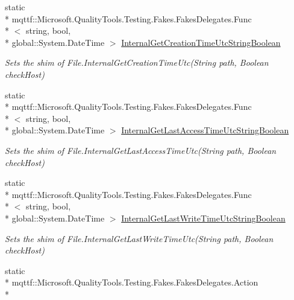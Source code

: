 \begin{DoxyCompactItemize}
static \\*
mqttf\-::\-Microsoft.\-Quality\-Tools.\-Testing.\-Fakes.\-Fakes\-Delegates.\-Func\\*
$<$ string, bool, \\*
global\-::\-System.\-Date\-Time $>$ \hyperlink{class_system_1_1_i_o_1_1_fakes_1_1_shim_file_ae49c156032823cdee2ac4b15a4be9dab}{Internal\-Get\-Creation\-Time\-Utc\-String\-Boolean}
\begin{DoxyCompactList}\small\item\em Sets the shim of File.\-Internal\-Get\-Creation\-Time\-Utc(\-String path, Boolean check\-Host)\end{DoxyCompactList}\item 
static \\*
mqttf\-::\-Microsoft.\-Quality\-Tools.\-Testing.\-Fakes.\-Fakes\-Delegates.\-Func\\*
$<$ string, bool, \\*
global\-::\-System.\-Date\-Time $>$ \hyperlink{class_system_1_1_i_o_1_1_fakes_1_1_shim_file_a506f1d51c9c4233bc8cae18f378a7c01}{Internal\-Get\-Last\-Access\-Time\-Utc\-String\-Boolean}
\begin{DoxyCompactList}\small\item\em Sets the shim of File.\-Internal\-Get\-Last\-Access\-Time\-Utc(\-String path, Boolean check\-Host)\end{DoxyCompactList}\item 
static \\*
mqttf\-::\-Microsoft.\-Quality\-Tools.\-Testing.\-Fakes.\-Fakes\-Delegates.\-Func\\*
$<$ string, bool, \\*
global\-::\-System.\-Date\-Time $>$ \hyperlink{class_system_1_1_i_o_1_1_fakes_1_1_shim_file_a45a25a581fa2cca2e8b1ffa3ee24cd18}{Internal\-Get\-Last\-Write\-Time\-Utc\-String\-Boolean}
\begin{DoxyCompactList}\small\item\em Sets the shim of File.\-Internal\-Get\-Last\-Write\-Time\-Utc(\-String path, Boolean check\-Host)\end{DoxyCompactList}\item 
static \\*
mqttf\-::\-Microsoft.\-Quality\-Tools.\-Testing.\-Fakes.\-Fakes\-Delegates.\-Action\\*

\end{DoxyCompactItemize}
